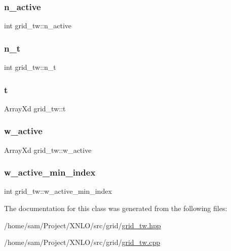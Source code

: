 \subsubsection{\texorpdfstring{n\+\_\+active}{n\_active}}
{\footnotesize\ttfamily int grid\+\_\+tw\+::n\+\_\+active}

\mbox{\label{classgrid__tw_ac121ce740479f628bdaa54627540ad42}} 
\subsubsection{\texorpdfstring{n\+\_\+t}{n\_t}}
{\footnotesize\ttfamily int grid\+\_\+tw\+::n\+\_\+t}

\mbox{\label{classgrid__tw_a918f1e6d18056d0f6da08fe01089b9b0}} 
\subsubsection{\texorpdfstring{t}{t}}
{\footnotesize\ttfamily Array\+Xd grid\+\_\+tw\+::t}

\mbox{\label{classgrid__tw_a66922766c9dfe5c4667e55e678b134b9}} 
\subsubsection{\texorpdfstring{w\+\_\+active}{w\_active}}
{\footnotesize\ttfamily Array\+Xd grid\+\_\+tw\+::w\+\_\+active}

\mbox{\label{classgrid__tw_a27d987fb3c8cbacf9cd152b83477f0d9}} 
\subsubsection{\texorpdfstring{w\+\_\+active\+\_\+min\+\_\+index}{w\_active\_min\_index}}
{\footnotesize\ttfamily int grid\+\_\+tw\+::w\+\_\+active\+\_\+min\+\_\+index}



The documentation for this class was generated from the following files\+:\begin{DoxyCompactItemize}
\item 
/home/sam/\+Project/\+X\+N\+L\+O/src/grid/\hyperlink{grid__tw_8hpp}{grid\+\_\+tw.\+hpp}\item 
/home/sam/\+Project/\+X\+N\+L\+O/src/grid/\hyperlink{grid__tw_8cpp}{grid\+\_\+tw.\+cpp}\end{DoxyCompactItemize}
